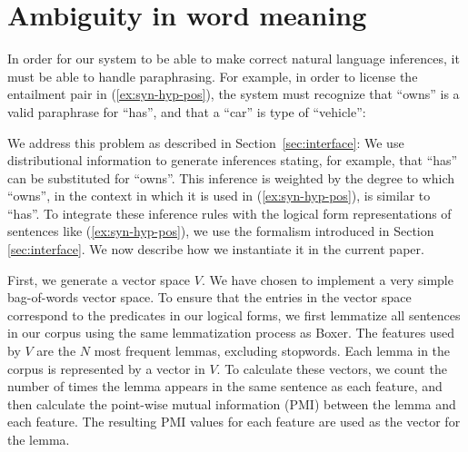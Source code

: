 \section{Ambiguity in word meaning}

In order for our system to be able to make correct natural language inferences,
it must be able to handle paraphrasing.  For example, in order to license the
entailment pair in (\ref{ex:syn-hyp-pos}), the system must recognize that
``owns'' is a valid paraphrase for ``has'', and that a ``car'' is type of
``vehicle'':


We address this problem as described in Section~\ref{sec:interface}: 
We use distributional information to
generate inferences stating, for example,  that ``has'' can be substituted for
``owns''. This inference is weighted by the degree to which 
``owns'', in the context in which it is used in
(\ref{ex:syn-hyp-pos}), is similar to ``has''. To integrate these
inference rules with the logical form representations of sentences
like (\ref{ex:syn-hyp-pos}), we use the formalism introduced in
Section \ref{sec:interface}. We now describe how we instantiate it in
the current paper.



First, we generate a vector space $V$.  We have chosen to implement a very
simple bag-of-words vector space.  To ensure that the entries in the vector
space correspond to the predicates in our logical forms, we first lemmatize all
sentences in our corpus using the same lemmatization process as Boxer.
The features used by $V$ are the $N$ most frequent lemmas, excluding stopwords.  
Each lemma in the corpus is represented by a vector in $V$.  To calculate these
vectors, we count the number of times the lemma appears in the same sentence
as each feature, and then calculate the point-wise mutual information (PMI)
between the lemma and each feature.  The resulting PMI values for each feature
are used as the vector for the lemma.

